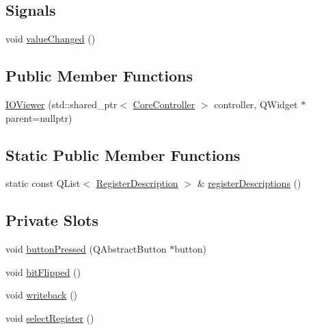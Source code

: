 \subsection*{Signals}
\begin{DoxyCompactItemize}
\item 
void \mbox{\hyperlink{class_q_g_b_a_1_1_i_o_viewer_a42edbfb2721d0c6e79e58da52d7d9844}{value\+Changed}} ()
\end{DoxyCompactItemize}
\subsection*{Public Member Functions}
\begin{DoxyCompactItemize}
\item 
\mbox{\hyperlink{class_q_g_b_a_1_1_i_o_viewer_abfa1e40a028fd0205df542ba45c80449}{I\+O\+Viewer}} (std\+::shared\+\_\+ptr$<$ \mbox{\hyperlink{class_q_g_b_a_1_1_core_controller}{Core\+Controller}} $>$ controller, Q\+Widget $\ast$parent=nullptr)
\end{DoxyCompactItemize}
\subsection*{Static Public Member Functions}
\begin{DoxyCompactItemize}
\item 
static const Q\+List$<$ \mbox{\hyperlink{class_q_g_b_a_1_1_i_o_viewer_ac2099e64016757f9d1162bab33cf51bf}{Register\+Description}} $>$ \& \mbox{\hyperlink{class_q_g_b_a_1_1_i_o_viewer_aa3556b84da7a172cacd46b3582d1bfa5}{register\+Descriptions}} ()
\end{DoxyCompactItemize}
\subsection*{Private Slots}
\begin{DoxyCompactItemize}
\item 
void \mbox{\hyperlink{class_q_g_b_a_1_1_i_o_viewer_a2ec5269b69bdbdf23c195fdb76a91be9}{button\+Pressed}} (Q\+Abstract\+Button $\ast$button)
\item 
void \mbox{\hyperlink{class_q_g_b_a_1_1_i_o_viewer_a811aa6b971d86f1ef93536ab80c811f0}{bit\+Flipped}} ()
\item 
void \mbox{\hyperlink{class_q_g_b_a_1_1_i_o_viewer_acff07815a227bbaa5b04fb85df8fa64a}{writeback}} ()
\item 
void \mbox{\hyperlink{class_q_g_b_a_1_1_i_o_viewer_a57f7fdec26467658e8bb78628fff66dc}{select\+Register}} ()
\end{DoxyCompactItemize}
